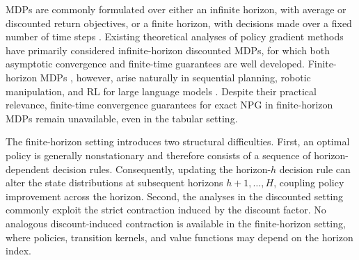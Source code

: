 \documentclass[11pt]{article}
\begin{document}
MDPs are commonly formulated over either an infinite horizon, with average or discounted return objectives, or a finite horizon, with decisions made over a fixed number of time steps \citep{puterman2014markov,jin2020provably}. Existing theoretical analyses of policy gradient methods have primarily
considered infinite-horizon discounted MDPs, for which both asymptotic
convergence \citep{kakade2001natural} and finite-time guarantees
\citep{fazel2018global,agarwal2021theory} are well developed. Finite-horizon
MDPs \citep{puterman2014markov,jin2020provably}, however, arise naturally in
sequential planning, robotic manipulation, and RL for large language models
\citep{Bai2022TrainingAH,ouyang2022training,
zhan2023policy, SHAKYA2023120495, bhandari2024global, zhang2025survey}. Despite their practical relevance,
finite-time convergence guarantees for exact NPG in finite-horizon MDPs remain
unavailable, even in the tabular setting.

The finite-horizon setting introduces two structural difficulties. First, an
optimal policy is generally nonstationary and therefore consists of a sequence
of horizon-dependent decision rules. Consequently, updating the horizon-$h$
decision rule can alter the state distributions at subsequent horizons
$h+1,\ldots,H$, coupling policy improvement across the horizon. Second, the analyses in the
discounted setting commonly exploit the strict contraction induced by the
discount factor. No analogous discount-induced contraction is available in
the finite-horizon setting, where policies, transition kernels, and value
functions may depend on the horizon index.
\end{document}
